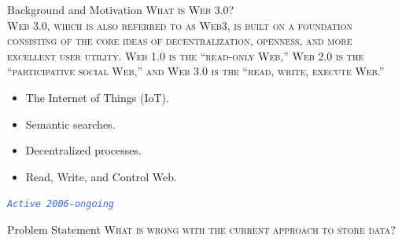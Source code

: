 \documentclass[aspectratio=169,usenames,dvipsnames,pdftex]{beamer}
\begin{document}
  \begin{frame}[t]{Background and Motivation}\vspace{8pt}
    \scshape{\Large What is Web 3.0?} \\[4pt]
    \normalshape{}
    Web 3.0, which is also referred to as Web3, is built on a foundation consisting of the core ideas of decentralization, openness, and more excellent user utility. Web 1.0 is the ``read-only Web,'' Web 2.0 is the ``participative social Web,'' and Web 3.0 is the ``read, write, execute Web.''

    \begin{itemize}
    \item The Internet of Things (IoT).
    \item Semantic searches.
    \item Decentralized processes.
    \item Read, Write, and Control Web.
    \end{itemize}

    \textit{\texttt{\textcolor{RoyalBlue}{Active 2006-ongoing}}}
  \end{frame}

  \begin{frame}[t]{Problem Statement}
    \scshape{\Large What is wrong with the current approach to store data?}
    \normalshape{}

    \begin{itemize}
    \end{itemize}
  \end{frame}
\end{document}

